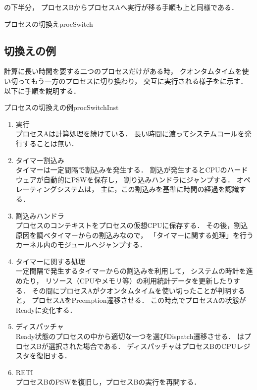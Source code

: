 の下半分，
プロセスBからプロセスAへ実行が移る手順も上と同様である．

{プロセスの切換え}{procSwitch}

\subsection{切換えの例}
計算に長い時間を要する二つのプロセスだけがある時，
クオンタムタイムを使い切ってもう一方のプロセスに切り換わり，
交互に実行される様子をに示す．
以下に手順を説明する．

{プロセスの切換えの例}{procSwitchInst}

\begin{enumerate}
\item 実行 \\
プロセスAは計算処理を続けている．
長い時間に渡ってシステムコールを発行することは無い．

\item タイマー割込み \\
タイマーは一定間隔で割込みを発生する．
割込が発生するとCPUのハードウェアが自動的にPSWを保存し，
割り込みハンドラにジャンプする．
オペレーティングシステムは，
主に，この割込みを基準に時間の経過を認識する．

\item 割込みハンドラ \\
プロセスのコンテキストをプロセスの仮想CPUに保存する．
その後，割込原因を調べタイマーからの割込みなので，
「タイマーに関する処理」を行うカーネル内のモジュールへジャンプする．

\item タイマーに関する処理 \\
一定間隔で発生するタイマーからの割込みを利用して，
システムの時計を進めたり，
リソース（CPUやメモリ等）の利用統計データを更新したりする．
その間にプロセスAがクオンタムタイムを使い切ったことが判明すると，
プロセスAをPreemption遷移させる．
この時点でプロセスAの状態がReadyに変化する．

\item ディスパッチャ \\
Ready状態のプロセスの中から適切な一つを選びDispatch遷移させる．
はプロセスBが選択された場合である．
ディスパッチャはプロセスBのCPUレジスタを復旧する．

\item RETI \\
プロセスBのPSWを復旧し，プロセスBの実行を再開する．


\end{enumerate}
